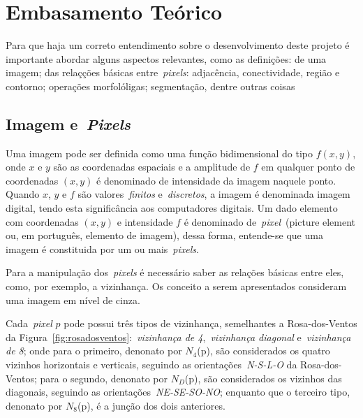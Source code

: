 \documentclass[conference]{Trabalho_2}
\begin{document}


\section{Embasamento Te\'orico}
Para que haja um correto entendimento sobre o desenvolvimento deste projeto \'e importante abordar alguns aspectos relevantes, como as defini\c{c}\~oes: de uma imagem; das rela\c{c}\c{c}\~oes b\'asicas entre~\textit{pixels}: adjac\^encia, conectividade, regi\~ao e contorno; opera\c{c}\~oes morfol\'oligas; segmenta\c{c}\~ao, dentre outras coisas

\subsection{Imagem e~\textit{Pixels}}
Uma imagem pode ser definida como uma fun\c{c}\~ao bidimensional do tipo $f(x,y)$, onde $x$ e $y$ s\~ao as coordenadas espaciais e a amplitude de $f$ em qualquer ponto de coordenadas $(x,y)$ \'e denominado de intensidade da imagem naquele ponto. Quando $x$, $y$ e $f$ s\~ao valores~\textit{finitos} e~\textit{discretos}, a imagem \'e denominada imagem digital, tendo esta signific\^ancia aos computadores digitais. Um dado elemento com coordenadas $(x,y)$ e intensidade $f$ \'e denominado de~\textit{pixel}~(picture element ou, em portugu\^es, elemento de imagem), dessa forma, entende-se que uma imagem \'e constituida por um ou mais~\textit{pixels}.

Para a manipula\c{c}\~ao dos~\textit{pixels} \'e necess\'ario saber as rela\c{c}\~oes b\'asicas entre eles, como, por exemplo, a vizinhan\c{c}a. Os conceito a serem apresentados consideram uma imagem em n\'ivel de cinza.

Cada~\textit{pixel} $p$ pode possui tr\^es tipos de vizinhan\c{c}a, semelhantes a Rosa-dos-Ventos da Figura~\ref{fig:rosadosventos}:~\textit{vizinhan\c{c}a de 4},~\textit{vizinhan\c{c}a diagonal} e~\textit{vizinhan\c{c}a de 8}; onde para o primeiro, denonato por $N_4$(p), s\~ao considerados os quatro vizinhos horizontais e verticais, seguindo as orienta\c{c}\~oes~\textit{N-S-L-O} da Rosa-dos-Ventos; para o segundo, denonato por $N_D$(p), s\~ao considerados os vizinhos das diagonais, seguindo as orienta\c{c}\~oes~\textit{NE-SE-SO-NO}; enquanto que o terceiro tipo, denonato por $N_8$(p), \'e a jun\c{c}\~ao dos dois anteriores.
\end{document}

